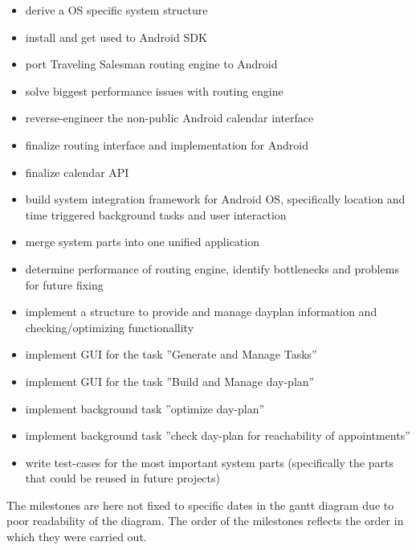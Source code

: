\begin{itemize}
\item derive a OS specific system structure
\item install and get used to Android SDK
\item port Traveling Salesman routing engine to Android
\item solve biggest performance issues with routing engine
\item reverse-engineer the non-public Android calendar interface
\item finalize routing interface and implementation for Android
\item finalize calendar API
\item build system integration framework for Android OS, specifically  location and time triggered background tasks and user interaction
\item merge system parts into one unified application
\item determine performance of routing engine, identify bottlenecks and problems for future fixing
\item implement a structure to provide and manage dayplan information and checking/optimizing functionallity  
\item implement GUI for the task ''Generate and Manage Tasks''
\item implement GUI for the task ''Build and Manage day-plan''
\item implement background task ''optimize day-plan''
\item implement background task ''check day-plan for reachability of appointments''
\item write test-cases for the most important system parts (specifically the parts that could be reused in future projects)
\end{itemize}
The milestones are here not fixed to specific dates in the gantt diagram due to poor readability of the diagram. The order of the milestones reflects the order in which they were carried out.
